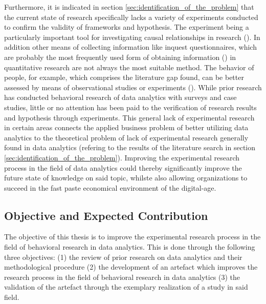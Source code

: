 Furthermore, it is indicated in section \ref{sec:identification_of_the_problem} that the current state of research specifically lacks a variety of experiments conducted to confirm the validity of frameworks and hypothesis. The experiment being a particularly important tool for investigating causal relationships in research (\cite{Gniewosz.2011}). In addition other means of collecting information like inquest questionnaires, which are probably the most frequently used form of obtaining information (\cite{Mummendey.2014}) in quantitative research are not always the most suitable method. The behavior of people, for example, which comprises the literature gap found, can be better assessed by means of observational studies or experiments (\cite{Gniewosz.2011}). While prior research has conducted behavioral research of data analytics with surveys and case studies, little or no attention has been paid to the verification of research results and hypothesis through experiments. This general lack of experimental research in certain areas connects the applied business problem of better utilizing data analytics to the theoretical problem of lack of experimental research generally found in data analytics (refering to the results of the literature search in section \ref{sec:identification_of_the_problem}). Improving the experimental research process in the field of data analytics could thereby significantly improve the future state of knowledge on said topic, whilste also allowing organizations to succeed in the fast paste economical environment of the digital-age.





\subsection{Objective and Expected Contribution}

The objective of this thesis is to improve the experimental research process in the field of behavioral research in data analytics. This is done through the following three objectives: (1) the review of prior research on data analytics and their methodological procedure (2) the development of an artefact which improves the research process in the field of behavioral research in data analytics (3) the validation of the artefact through the exemplary realization of a study in said field.

